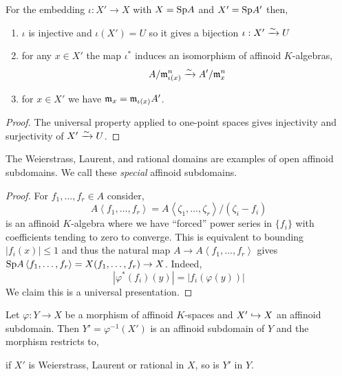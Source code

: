 \documentclass[12pt]{article}
\begin{document}
\begin{lemma}
For the embedding $\iota : X' \to X$ with $X = \mathrm{Sp}{A}$ and $X' = \mathrm{Sp}{A'}$ then,
\begin{enumerate}
\item $\iota$ is injective and $\iota(X') = U$ so it gives a bijection $\iota : X' \xrightarrow{\sim} U$
\item for any $x \in X'$ the map $\iota^*$ induces an isomorphism of affinoid $K$-algebras,
\[ A / \mathfrak{m}^n_{\iota(x)} \xrightarrow{\sim} A' / \mathfrak{m}_x^n \]
\item for $x \in X'$ we have $\mathfrak{m}_x = \mathfrak{m}_{\iota(x)} A'$.
\end{enumerate}
\end{lemma}

\begin{proof}
The universal property applied to one-point spaces gives injectivity and surjectivity of $X' \xrightarrow{\sim} U$. 
\end{proof}

\begin{prop}
The Weierstrass, Laurent, and rational domains are examples of open affinoid subdomains. We call these \textit{special} affinoid subdomains. 
\end{prop}

\begin{proof}
For $f_1, \dots, f_r \in A$ consider,
\[ A\left< f_1, \dots, f_r \right> = A \left< \zeta_1, \dots, \zeta_r \right>  / (\zeta_i - f_i) \]
is an affinoid $K$-algebra where we have ``forced'' power series in $\{ f_i \}$ with coefficients tending to zero to converge. This is equivalent to bounding $|f_i(x)| \le 1$ and thus the natural map $A \to A \left< f_1, \dots, f_r \right>$ gives $\mathrm{Sp}{A\left< f_1, \dots, f_r\right>} = X(f_1, \dots, f_r) \to X$. Indeed, 
\[ |\varphi^*(f_i)(y)| = |f_i(\varphi(y))| \]
We claim this is a universal presentation. 
\end{proof}

\begin{prop}
Let $\varphi : Y \to X$ be a morphism of affinoid $K$-spaces and $X' \hookrightarrow X$ an affinoid subdomain. Then $Y' = \varphi^{-1}(X')$ is an affinoid subdomain of $Y$ and the morphism restricts to,
\begin{center}
\end{center}
if $X'$ is Weierstrass, Laurent or rational in $X$, so is $Y'$ in $Y$.
\end{prop}
\end{document}
